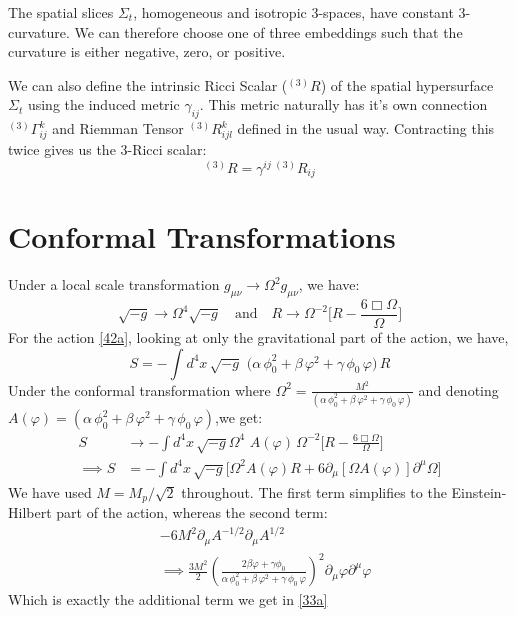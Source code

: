 \documentclass[aps,prd,reprint,preprintnumbers,showpacs,floatfix,nofootinbib,superscript address]{revtex4-2}
\begin{document}

The spatial slices $\Sigma_t$, homogeneous and isotropic 3-spaces, have constant 3-curvature. We can therefore choose one of three embeddings such that the curvature is either negative, zero, or positive. 

We can also define the intrinsic Ricci Scalar (${}^{(3)}R$) of the spatial hypersurface $\Sigma_t$ using the induced metric $\gamma_{ij}$. This metric naturally has it's own connection ${}^{(3)}\Gamma_{ij}^k$ and Riemman Tensor ${}^{(3)}R_{ijl}^k$ defined in the usual way. Contracting this twice gives us the 3-Ricci scalar:
\begin{equation}
    {}^{(3)}R = \gamma^{ij} \,{}^{(3)}R_{ij}
\end{equation}


\section{Conformal Transformations} \label{Conformal Transformations}

Under a local scale transformation $g_{\mu\nu} \rightarrow \Omega^2 g_{\mu\nu} $, we have:
\[
 \sqrt{-g} \rightarrow \Omega^{4} \sqrt{-g} \quad\text{and}\quad R\rightarrow\Omega^{-2}\Big[R-\frac{6\Box\Omega}{\Omega} \Big]
\]
For the action \cref{42a}, looking at only the gravitational part of the action, we have,
\begin{equation}
    S = -\int d^4x\,\sqrt{-g}\, 
  \,\bigl(\alpha\,\phi_0^2 + \beta\,\varphi^2 + \gamma\,\phi_0\,\varphi\bigr)\,R
\end{equation}
Under the conformal transformation where $ \Omega^2 = \frac{M^2}{(\alpha\,\phi_0^2+\beta\,\varphi^2+\gamma\,\phi_0\,\varphi)}$ and denoting $A(\varphi) = (\alpha\,\phi_0^2+\beta\,\varphi^2+\gamma\,\phi_0\,\varphi)$,we get:
\begin{align}
    S &\rightarrow -\int d^4x\,\sqrt{-g} \Omega^{4}\, 
  \,A(\varphi)\, \Omega^{-2}\Big[R-\frac{6\Box\Omega}{\Omega} \Big] \nonumber \\
  \implies S &= - \int d^4x\,\sqrt{-g} \Big[ \Omega^2 A(\varphi) R + 6 \partial_\mu[\Omega A(\varphi)] \partial^\mu\Omega \Big]
\end{align}
We have used $M = M_p/\sqrt{2}$ throughout. The first term simplifies to the Einstein-Hilbert part of the action, whereas the second term:
\begin{align}
    &-6M^2 \partial_\mu A^{-1/2} \partial_\mu A^{1/2} \nonumber \\
    &\implies \frac{3M^2}{2} \left( \frac{2\beta \varphi + \gamma\phi_0}{\alpha\,\phi_0^2+\beta\,\varphi^2+\gamma\,\phi_0\,\varphi} \right)^2 \partial_\mu \varphi \partial^\mu \varphi
\end{align}
Which is exactly the additional term we get in \cref{33a}
\end{document}
